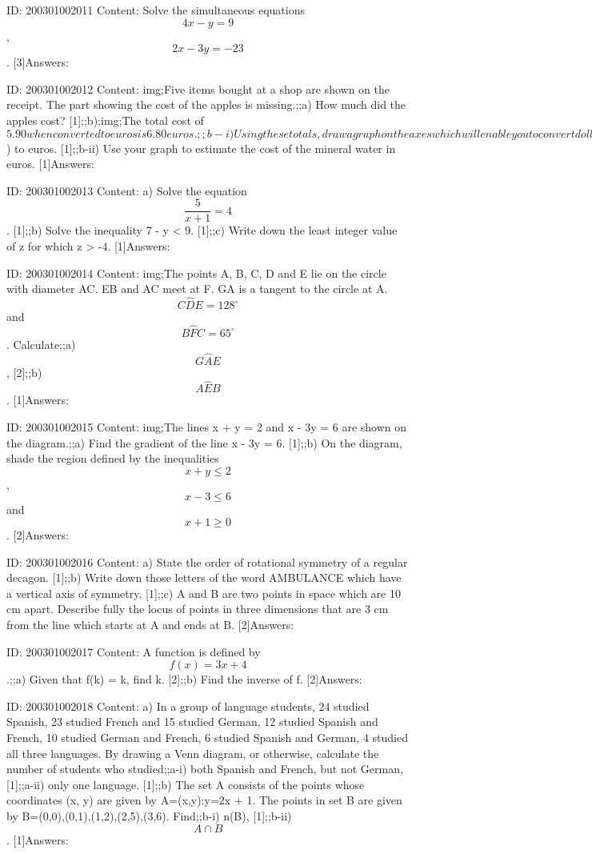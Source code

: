 \documentclass{article}
\begin{document}
ID: 200301002011
Content:
Solve the simultaneous equations $$4x-y=9$$, $$2x-3y=-23$$. [3]Answers:

ID: 200301002012
Content:
img;Five items bought at a shop are shown on the receipt. The part showing the cost of the apples is missing.;;a) How much did the apples cost? [1];;b);img;The total cost of $5.90 when converted to euros is 6.80 euros.;;b-i) Using these totals, draw a graph on the axes which will enable you to convert dollars ($) to euros. [1];;b-ii) Use your graph to estimate the cost of the mineral water in euros. [1]Answers:

ID: 200301002013
Content:
a) Solve the equation $$\frac{5}{x+1}=4$$. [1];;b) Solve the inequality 7 - y < 9. [1];;c) Write down the least integer value of z for which  z > -4. [1]Answers:

ID: 200301002014
Content:
img;The points A, B, C, D and E lie on the circle with diameter AC. EB and AC meet at F. GA is a tangent to the circle at A. $$C \hat DE = 128^{\circ}$$ and $$B \hat FC = 65^{\circ}$$. Calculate;;a) $$G \hat AE$$, [2];;b) $$A \hat EB$$. [1]Answers:

ID: 200301002015
Content:
img;The lines x + y = 2 and x - 3y = 6 are shown on the diagram.;;a) Find the gradient of the line x - 3y = 6. [1];;b) On the diagram, shade the region defined by the inequalities $$x+y\leq2$$, $$x-3\leq6$$ and $$x+1 \geq 0$$. [2]Answers:

ID: 200301002016
Content:
a) State the order of rotational symmetry of a regular decagon. [1];;b) Write down those letters of the word AMBULANCE which have a vertical axis of symmetry. [1];;c) A and B are two points in space which are 10 cm apart. Describe fully the locus of points in three dimensions that are 3 cm from the line which starts at A and ends at B. [2]Answers:

ID: 200301002017
Content:
A function is defined by $$f(x) = 3x + 4$$.;;a) Given that f(k) = k, find k. [2];;b) Find the inverse of f. [2]Answers:

ID: 200301002018
Content:
a) In a group of language students, 24 studied Spanish, 23 studied French and 15 studied	German, 12 studied Spanish and French, 10 studied German and French, 6 studied Spanish and German, 4 studied all three languages. By drawing a Venn diagram, or otherwise, calculate the number of students who studied;;a-i) both Spanish and French, but not German, [1];;a-ii) only one language. [1];;b) The set A consists of the points whose coordinates (x, y) are given by A={(x,y):y=2x + 1}. The points in set B are given by B={(0,0),(0,1),(1,2),(2,5),(3,6)}. Find;;b-i) n(B), [1];;b-ii) $$A \cap B$$. [1]Answers:
\end{document}
